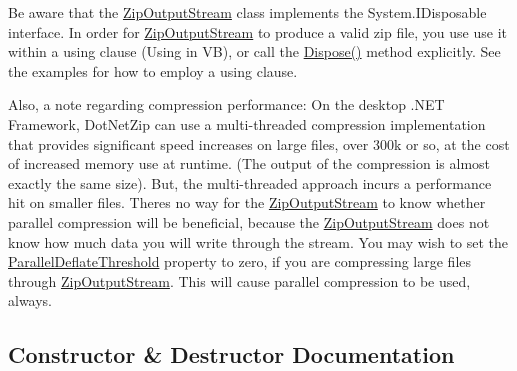 Be aware that the {\ttfamily \mbox{\hyperlink{class_super_tiled2_unity_1_1_ionic_1_1_zip_1_1_zip_output_stream}{Zip\+Output\+Stream}}} class implements the System.\+I\+Disposable interface. In order for {\ttfamily \mbox{\hyperlink{class_super_tiled2_unity_1_1_ionic_1_1_zip_1_1_zip_output_stream}{Zip\+Output\+Stream}}} to produce a valid zip file, you use use it within a using clause ({\ttfamily Using} in VB), or call the {\ttfamily \mbox{\hyperlink{class_super_tiled2_unity_1_1_ionic_1_1_zip_1_1_zip_output_stream_ac792f46e1b4cde3da0aa1eaf4ad28db4}{Dispose()}}} method explicitly. See the examples for how to employ a using clause. 

Also, a note regarding compression performance\+: On the desktop .N\+ET Framework, Dot\+Net\+Zip can use a multi-\/threaded compression implementation that provides significant speed increases on large files, over 300k or so, at the cost of increased memory use at runtime. (The output of the compression is almost exactly the same size). But, the multi-\/threaded approach incurs a performance hit on smaller files. There\textquotesingle{}s no way for the \mbox{\hyperlink{class_super_tiled2_unity_1_1_ionic_1_1_zip_1_1_zip_output_stream}{Zip\+Output\+Stream}} to know whether parallel compression will be beneficial, because the \mbox{\hyperlink{class_super_tiled2_unity_1_1_ionic_1_1_zip_1_1_zip_output_stream}{Zip\+Output\+Stream}} does not know how much data you will write through the stream. You may wish to set the \mbox{\hyperlink{class_super_tiled2_unity_1_1_ionic_1_1_zip_1_1_zip_output_stream_a9918f5fa946840eb0ffee089ce5485b8}{Parallel\+Deflate\+Threshold}} property to zero, if you are compressing large files through {\ttfamily \mbox{\hyperlink{class_super_tiled2_unity_1_1_ionic_1_1_zip_1_1_zip_output_stream}{Zip\+Output\+Stream}}}. This will cause parallel compression to be used, always. 

\subsection{Constructor \& Destructor Documentation}
\mbox{\label{class_super_tiled2_unity_1_1_ionic_1_1_zip_1_1_zip_output_stream_ae484108e008d5822cd7e140bcf44e9fe}} 
